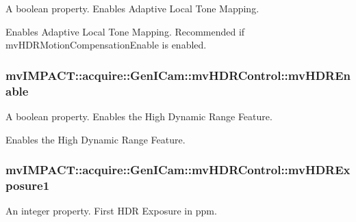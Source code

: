 A boolean property. Enables Adaptive Local Tone Mapping. 

Enables Adaptive Local Tone Mapping. Recommended if mv\+H\+D\+R\+Motion\+Compensation\+Enable is enabled. \hypertarget{classmv_i_m_p_a_c_t_1_1acquire_1_1_gen_i_cam_1_1mv_h_d_r_control_a118715db2d996d5f7f3eb2839ef49959}{
\subsubsection[{mv\+H\+D\+R\+Enable}]{ mv\+I\+M\+P\+A\+C\+T\+::acquire\+::\+Gen\+I\+Cam\+::mv\+H\+D\+R\+Control\+::mv\+H\+D\+R\+Enable}}\label{classmv_i_m_p_a_c_t_1_1acquire_1_1_gen_i_cam_1_1mv_h_d_r_control_a118715db2d996d5f7f3eb2839ef49959}


A boolean property. Enables the High Dynamic Range Feature. 

Enables the High Dynamic Range Feature. \hypertarget{classmv_i_m_p_a_c_t_1_1acquire_1_1_gen_i_cam_1_1mv_h_d_r_control_afe30d67ae209916f3c18a85b08e87233}{
\subsubsection[{mv\+H\+D\+R\+Exposure1}]{ mv\+I\+M\+P\+A\+C\+T\+::acquire\+::\+Gen\+I\+Cam\+::mv\+H\+D\+R\+Control\+::mv\+H\+D\+R\+Exposure1}}\label{classmv_i_m_p_a_c_t_1_1acquire_1_1_gen_i_cam_1_1mv_h_d_r_control_afe30d67ae209916f3c18a85b08e87233}


An integer property. First H\+D\+R Exposure in ppm. 

